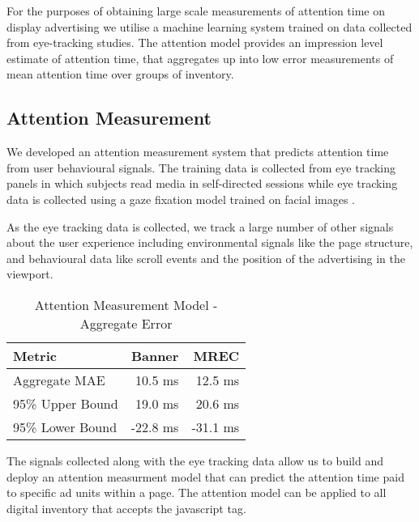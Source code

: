 \documentclass[sigconf]{acmart}
\begin{document}
For the purposes of obtaining large scale measurements of attention time on
display advertising we utilise a machine learning system trained on data
collected from eye-tracking studies.
The attention model provides an impression level estimate of attention time,
that aggregates up into low error measurements of mean attention
time over groups of inventory.

\subsection{Attention Measurement}

We developed an attention measurement system that predicts attention time from user
behavioural signals. The training data is collected from eye tracking panels in
which subjects read media in self-directed sessions while eye tracking data is collected
using a gaze fixation model trained on facial images \cite{Krafka2016}.

As the eye tracking data is collected, we track a large number of other signals
about the user experience including environmental signals like the page structure,
and behavioural data like scroll events and the position of the advertising
in the viewport.

\begin{table}
  \caption{Attention Measurement Model - Aggregate Error}
  \label{tab:atm}
\begin{tabular}{|l|r|r|}
\toprule
Metric                  &Banner       &MREC       \\
\midrule
Aggregate MAE           &10.5 ms      &12.5 ms    \\
95\% Upper Bound        &19.0 ms      &20.6 ms    \\
95\% Lower Bound        &-22.8 ms     &-31.1 ms   \\
  \bottomrule
\end{tabular}
\end{table}

The signals collected along with the eye tracking data allow us to build and deploy an
attention measurment model that can predict the attention time paid to
specific ad units within a page. The attention model can
be applied to all digital inventory that accepts the javascript tag.
\end{document}
